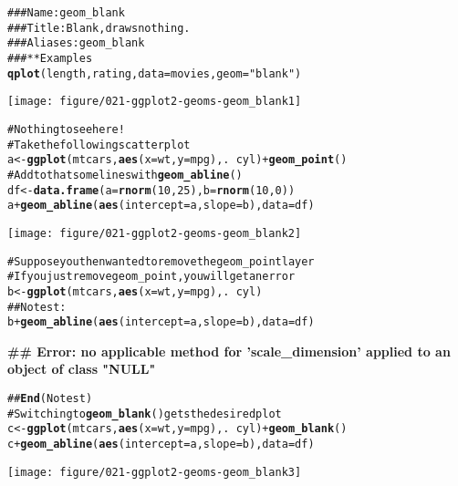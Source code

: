 \documentclass[a4paper,titlepage]{tufte-handout}\usepackage{graphicx, color}
\makeatletter
\def\maxwidth{ %
  \ifdim\Gin@nat@width>\linewidth
    \linewidth
  \else
    \Gin@nat@width
  \fi
}
\newcommand{\hlfunctioncall}[1]{\textcolor[rgb]{0.501960784313725,0,0.329411764705882}{\textbf{#1}}}%
\newcommand{\hlstring}[1]{\textcolor[rgb]{0.6,0.6,1}{#1}}%
\newcommand{\hlcomment}[1]{\textcolor[rgb]{0.180392156862745,0.6,0.341176470588235}{#1}}%
\newenvironment{kframe}{%
 \def\at@end@of@kframe{}%
 \ifinner\ifhmode%
  \def\at@end@of@kframe{\end{minipage}}%
  \begin{minipage}{\columnwidth}%
 \fi\fi%
 \def\FrameCommand##1{\hskip\@totalleftmargin \hskip-\fboxsep
 \colorbox{shadecolor}{##1}\hskip-\fboxsep
     \hskip-\linewidth \hskip-\@totalleftmargin \hskip\columnwidth}%
 \MakeFramed {\advance\hsize-\width
   \@totalleftmargin\z@ \linewidth\hsize
   \@setminipage}}%
 {\par\unskip\endMakeFramed%
 \at@end@of@kframe}
\newenvironment{knitrout}{}{} %
\makeatother
\begin{document}
\begin{knitrout}
\color{fgcolor}\begin{kframe}
\begin{alltt}
\hlcomment{### Name: geom_blank}
\hlcomment{### Title: Blank, draws nothing.}
\hlcomment{### Aliases: geom_blank}
\hlcomment{### ** Examples}
\hlfunctioncall{qplot}(length, rating, data = movies, geom = \hlstring{"blank"})
\end{alltt}
\end{kframe}\texttt{[image: figure/021-ggplot2-geoms-geom\_blank1]} \begin{kframe}\begin{alltt}
\hlcomment{# Nothing to see here!}
\hlcomment{# Take the following scatter plot}
a <- \hlfunctioncall{ggplot}(mtcars, \hlfunctioncall{aes}(x = wt, y = mpg), . ~ cyl) + \hlfunctioncall{geom_point}()
\hlcomment{# Add to that some lines with \hlfunctioncall{geom_abline}()}
df <- \hlfunctioncall{data.frame}(a = \hlfunctioncall{rnorm}(10, 25), b = \hlfunctioncall{rnorm}(10, 0))
a + \hlfunctioncall{geom_abline}(\hlfunctioncall{aes}(intercept = a, slope = b), data = df)
\end{alltt}
\end{kframe}\texttt{[image: figure/021-ggplot2-geoms-geom\_blank2]} \begin{kframe}\begin{alltt}
\hlcomment{# Suppose you then wanted to remove the geom_point layer}
\hlcomment{# If you just remove geom_point, you will get an error}
b <- \hlfunctioncall{ggplot}(mtcars, \hlfunctioncall{aes}(x = wt, y = mpg), . ~ cyl)
\hlcomment{## No test: }
b + \hlfunctioncall{geom_abline}(\hlfunctioncall{aes}(intercept = a, slope = b), data = df)
\end{alltt}


{\ttfamily\noindent\bfseries\textcolor{errorcolor}{\#\# Error: no applicable method for 'scale\_dimension' applied to an object of class "NULL"}}\begin{alltt}
\hlcomment{## \hlfunctioncall{End}(No test)}
\hlcomment{# Switching to \hlfunctioncall{geom_blank}() gets the desired plot}
c <- \hlfunctioncall{ggplot}(mtcars, \hlfunctioncall{aes}(x = wt, y = mpg), . ~ cyl) + \hlfunctioncall{geom_blank}()
c + \hlfunctioncall{geom_abline}(\hlfunctioncall{aes}(intercept = a, slope = b), data = df)
\end{alltt}
\end{kframe}\texttt{[image: figure/021-ggplot2-geoms-geom\_blank3]} 
\end{knitrout}
\end{document}
